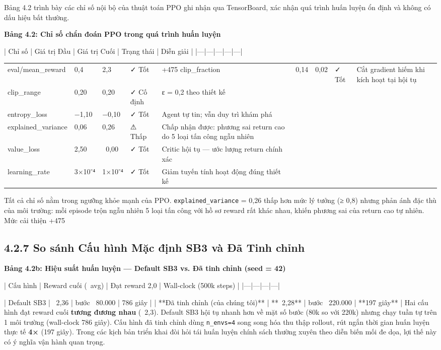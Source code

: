 \documentclass[12pt,a4paper,twoside]{report}
\begin{document}
{{{Bảng 4.2 trình bày các chỉ số nội bộ của thuật toán PPO ghi nhận qua TensorBoard, xác nhận quá trình huấn luyện ổn định và không có dấu hiệu bất thường.

\textbf{Bảng 4.2: Chỉ số chẩn đoán PPO trong quá trình huấn luyện}

| Chỉ số | Giá trị Đầu | Giá trị Cuối | Trạng thái | Diễn giải |
|---|---|---|---|---|


\begin{tabular}{p{2.5cm}p{2.5cm}p{2.5cm}p{2.5cm}p{2.5cm}}
\hline
eval/mean_reward & 0,4 & 2,3 & ✓ Tốt & +475%
\hline
clip_fraction & 0,14 & 0,02 & ✓ Tốt & Cắt gradient hiếm khi kích hoạt tại hội tụ \\
clip_range & 0,20 & 0,20 & ✓ Cố định & ε = 0,2 theo thiết kế \\
entropy_loss & −1,10 & −0,10 & ✓ Tốt & Agent tự tin; vẫn duy trì khám phá \\
explained_variance & 0,06 & 0,26 & ⚠ Thấp & Chấp nhận được: phương sai return cao do 5 loại tấn công ngẫu nhiên \\
value_loss & 2,50 & ~0,00 & ✓ Tốt & Critic hội tụ — ước lượng return chính xác \\
learning_rate & 3×10⁻⁴ & 1×10⁻⁴ & ✓ Tốt & Giảm tuyến tính hoạt động đúng thiết kế \\
\hline
\end{tabular}

Tất cả chỉ số nằm trong ngưỡng khỏe mạnh của PPO. \texttt{explained_variance} = 0,26 thấp hơn mức lý tưởng (≥ 0,8) nhưng phản ánh đặc thù của môi trường: mỗi episode trộn ngẫu nhiên 5 loại tấn công với hồ sơ reward rất khác nhau, khiến phương sai của return cao tự nhiên. Mức cải thiện +475%

\subsection{4.2.7 So sánh Cấu hình Mặc định SB3 và Đã Tinh chỉnh}

\textbf{Bảng 4.2b: Hiệu suất huấn luyện — Default SB3 vs. Đã tinh chỉnh (seed = 42)}

| Cấu hình | Reward cuối (~avg) | Đạt reward 2,0 | Wall-clock (500k steps) |
|---|---|---|---|

| Default SB3 | ~2,36 | bước ~80.000 | 786 giây |
| **Đã tinh chỉnh (của chúng tôi)** | **~2,28** | bước ~220.000 | **197 giây** |
Hai cấu hình đạt reward cuối \textbf{tương đương nhau} (~2,3). Default SB3 hội tụ nhanh hơn về mặt số bước (80k so với 220k) nhưng chạy tuần tự trên 1 môi trường (wall-clock 786 giây). Cấu hình đã tinh chỉnh dùng \texttt{n_envs=4} song song hóa thu thập rollout, rút ngắn thời gian huấn luyện thực tế \textbf{4×} (197 giây). Trong các kịch bản triển khai đòi hỏi tái huấn luyện chính sách thường xuyên theo diễn biến mối đe dọa, lợi thế này có ý nghĩa vận hành quan trọng.

}}}
\end{document}
